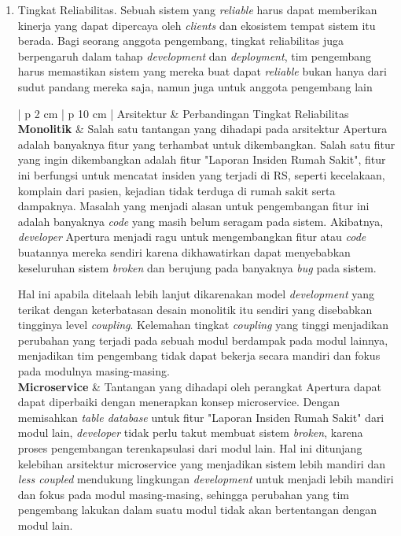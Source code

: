 \begin{enumerate}[leftmargin=*]
	\item Tingkat Reliabilitas. Sebuah sistem yang \textit{reliable} harus dapat memberikan kinerja yang dapat dipercaya oleh \textit{clients} dan ekosistem tempat sistem itu berada. Bagi seorang anggota pengembang, tingkat reliabilitas juga berpengaruh dalam tahap \textit{development} dan \textit{deployment}, tim pengembang harus memastikan sistem yang mereka buat dapat \textit{reliable} bukan hanya dari sudut pandang mereka saja, namun juga untuk anggota pengembang lain
	\begin{table}[H]
		\small
		\begin{adjustbox}{width=1\textwidth}
			\begin{tabular}{| p {2 cm} | p {10 cm} |}
				\hline
				Arsitektur & Perbandingan Tingkat Reliabilitas\\
				\hline
				\textbf{Monolitik} & Salah satu tantangan yang dihadapi pada arsitektur Apertura adalah banyaknya fitur yang terhambat untuk dikembangkan. Salah satu fitur yang ingin dikembangkan adalah fitur "Laporan Insiden Rumah Sakit", fitur ini berfungsi untuk mencatat insiden yang terjadi di RS, seperti kecelakaan, komplain dari pasien, kejadian tidak terduga di rumah sakit serta dampaknya. Masalah yang menjadi alasan untuk pengembangan fitur ini adalah banyaknya \textit{code} yang masih belum seragam pada sistem. Akibatnya, \textit{developer} Apertura menjadi ragu untuk mengembangkan fitur atau \textit{code} buatannya mereka sendiri karena dikhawatirkan dapat menyebabkan keseluruhan sistem \textit{broken} dan berujung pada banyaknya \textit{bug} pada sistem.
				
				Hal ini apabila ditelaah lebih lanjut dikarenakan model \textit{development} yang terikat dengan keterbatasan desain monolitik itu sendiri yang disebabkan tingginya level \textit{coupling}. Kelemahan tingkat \textit{coupling} yang tinggi menjadikan perubahan yang terjadi pada sebuah modul berdampak pada modul lainnya, menjadikan tim pengembang tidak dapat bekerja secara mandiri dan fokus pada modulnya masing-masing.\\
				\hline
				\textbf{Microservice} & Tantangan yang dihadapi oleh perangkat Apertura dapat dapat diperbaiki dengan menerapkan konsep microservice. Dengan memisahkan \textit{table database} untuk fitur "Laporan Insiden Rumah Sakit" dari modul lain, \textit{developer} tidak perlu takut membuat sistem \textit{broken}, karena proses pengembangan terenkapsulasi dari modul lain. Hal ini ditunjang kelebihan arsitektur microservice yang menjadikan sistem lebih mandiri dan \textit{less coupled} mendukung lingkungan \textit{development} untuk menjadi lebih mandiri dan fokus pada modul masing-masing, sehingga perubahan yang tim pengembang lakukan dalam suatu modul tidak akan bertentangan dengan modul lain.
				

\end{tabular}
\end{adjustbox}
\end{table}
\end{enumerate}
